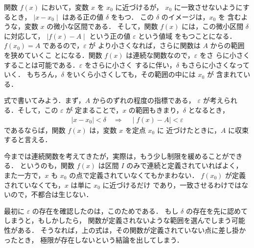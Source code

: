                 関数 $f(x)$ において，変数 $x$ を $x_{0}$ に近づけるが，
                $x_{0}$ に一致させないようにするとき，
                $\mid x-x_{0} \mid$ はある正の値 $\delta$ をもつ．
                この $\delta$ のイメージは，$x_{0}$ を
                含むような，変数 $x$ の微小な区間である．
                そして，関数 $f(x)$ には，この微小区間 $\delta$ に対応して，
                $\mid f(x) - A \mid$ という正の値 $\varepsilon$ という値域
                をもつことになる．$f(x_{0})=A$ であるので，$\varepsilon$ が
                より小さくなれば，さらに関数は $A$ からの範囲を狭めていくこ
                とになる．関数 $f(x)$ は連続な関数なので，$\varepsilon$ をさ
                らに小さくすることは可能である．$\varepsilon$ をさらに小さく
                するに伴い，$\delta$ もさらに小さくなっていく．
                もちろん，$\delta$ をいくら小さくしても，その範囲の中には $x_{0}$ が
                含まれている．

                式で書いてみよう．まず，$A$ からのずれの程度の指標である，
                $\varepsilon$ が考えられる．そして，この $\varepsilon$ が
                定まることで，$x$ の範囲もきまり，$\delta$ となるとき，
                    \begin{align}
                        \mid x-x_{0} \mid < \delta \quad
                        \Rightarrow \quad \mid f(x) - A \mid < \varepsilon
                    \end{align}
                であるならば，関数 $f(x)$ は，変数 $x$ を定点 $x_{0}$ に
                近づけたときに，$A$ に収束すると言える．

                今までは連続関数を考えてきたが，実際は，もう少し制限を緩めることができる．
                というのも，関数 $f(x)$ は区間 $I$ のみで連続と定義されていればよく，
                また一方で，$x$ も $x_{0}$ の点で定義されていなくてもかまわない．
                $f(x_{0})$ が定義されていなくても，$x$ は単に $x_{0}$ に近づけるだけ
                であり，一致させるわけではないので，不都合は生じない．

                最初に $\varepsilon$ の存在を確認したのは，このためである．
                もし $\delta$ の存在を先に認めてしまうと，もしかしたら，
                関数が定義されないような範囲を選んでしまう可能性がある．
                そうなれば，上の式は，その関数が定義されていない点に差し掛かったとき，
                極限が存在しないという結論を出してしまう．

